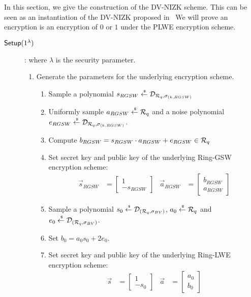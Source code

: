 In this section, we give the construction of the DV-NIZK scheme.
This can be seen as an instantiation of the DV-NIZK proposed in~\cite{DBLP:conf/pkc/ChaidosG15}
We will prove an encryption is an encryption of $0$ or $1$ under the PLWE encryption scheme.

\begin{description}
\item[${\mathsf{Setup}}(1^\lambda)$]: where $\lambda$ is the security parameter.
  \begin{enumerate}
    \item Generate the parameters for the underlying encryption scheme.
      \begin{enumerate}
      \item Sample a polynomial $s_{RGSW} \stackrel{{\scriptscriptstyle \mkern4mu \$}}{\gets} \mathcal{D}_{{\mathcal{R}}_q, \sigma_{(k,RGSW)}}$
      \item Uniformly sample $a_{RGSW} \stackrel{{\scriptscriptstyle \mkern4mu \$}}{\gets} {\mathcal{R}}_q$ and a noise polynomial $e_{RGSW} \stackrel{{\scriptscriptstyle \mkern4mu \$}}{\gets} \mathcal{D}_{{\mathcal{R}}_q, \sigma_{(k, RGSW)}}$.
      \item Compute $b_{RGSW} = s_{RGSW} \cdot a_{RGSW} + e_{RGSW} \in {\mathcal{R}}_q$
      \item Set secret key and public key of the underlying Ring-GSW encryption scheme:
        \begin{align*}
          \vec{s}_{RGSW} &= \begin{bmatrix} 1 \\ -s_{RGSW} \end{bmatrix}  & \vec{a}_{RGSW} &=  \begin{bmatrix} b_{RGSW} \\ a_{RGSW}\end{bmatrix}
        \end{align*}
      \item Sample a polynomial $s_0 \stackrel{{\scriptscriptstyle \mkern4mu \$}}{\gets} \mathcal{D}_{({\mathcal{R}}_q, \sigma_{BV})}$, $a_0 \stackrel{{\scriptscriptstyle \mkern4mu \$}}{\gets} {\mathcal{R}}_q$ and $e_0 \stackrel{{\scriptscriptstyle \mkern4mu \$}}{\gets} \mathcal{D}_{({\mathcal{R}}_q, \sigma_{BV})}$.
      \item Set $b_0 = a_0 s_0 + 2 e_0$.
      \item Set secret key and public key of the underlying Ring-LWE encryption scheme:
        \begin{align*}
          \vec{s} &= \begin{bmatrix} 1 \\ -s_0\end{bmatrix} & \vec{a} &= \begin{bmatrix} a_0 \\ b_0\end{bmatrix}

\end{align*}
\end{enumerate}
\end{enumerate}
\end{description}
